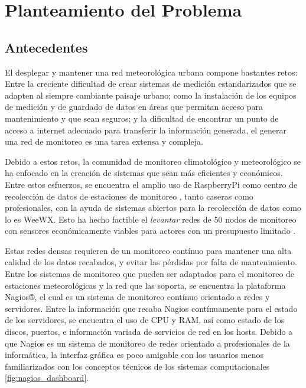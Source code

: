 \chapter{Planteamiento del Problema}

\section{Antecedentes}

El desplegar y mantener una red meteorológica urbana compone bastantes retos: Entre la creciente dificultad de crear sistemas de medición estandarizados que se adapten al siempre cambiante paisaje urbano; como la instalación de los equipos de medición y de guardado de datos en áreas que permitan acceso para mantenimiento y que sean seguros; y la dificultad de encontrar un punto de acceso a internet adecuado para transferir la información generada, el generar una red de monitoreo es una tarea extensa y compleja.

Debido a estos retos, la comunidad de monitoreo climatológico y meteorológico se ha enfocado en la creación de sistemas que sean más eficientes y económicos. Entre estos esfuerzos, se encuentra el amplio uso de RaspberryPi como centro de recolección de datos de estaciones de monitoreo \cite{rpi_weataher_station}, tanto caseras como profesionales, con la ayuda de sistemas abiertos para la recolección de datos como lo es WeeWX. Esto ha hecho factible el \textit{levantar} redes de 50 nodos de monitoreo con sensores económicamente viables para actores con un presupuesto limitado \cite{monitoreo_raspberry_nagios}.



Estas redes densas requieren de un monitoreo contínuo para mantener una alta calidad de los datos recabados, y evitar las pérdidas por falta de mantenimiento. Entre los sistemas de monitoreo que pueden ser adaptados para el monitoreo de estaciones meteorológicas y la red que las soporta, se encuentra la plataforma Nagios®, el cual es un sistema de monitoreo contínuo orientado a redes y servidores. Entre la información que recaba Nagios contínuamente para el estado de los servidores, se encuentra el uso de CPU y RAM, así como estado de los discos, puertos, e información variada de servicios de red en los hosts. Debido a que Nagios es un sistema de monitoreo de redes orientado a profesionales de la informática, la interfaz gráfica es poco amigable con los usuarios menos familiarizados con los conceptos técnicos de los sistemas computacionales \ref{fig:nagios_dashboard}.

